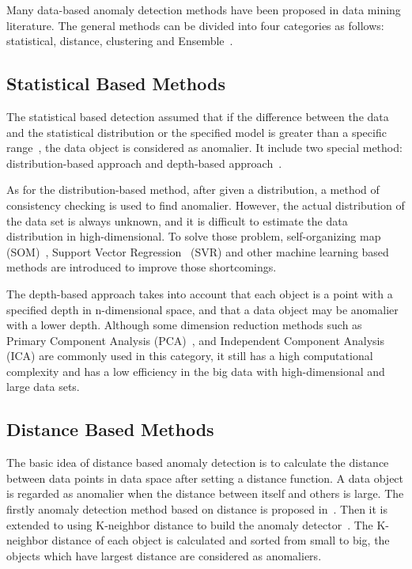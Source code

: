 Many data-based anomaly detection methods have been proposed in
data mining literature.
The general methods can be divided into four categories as follows:
statistical,
distance,
clustering and Ensemble~\cite{cook2019anomaly}.


\subsection{Statistical Based Methods}

The statistical based detection assumed that
if the difference between the data and the statistical
distribution or the specified model
is greater than a specific range~\cite{chandola2009anomaly},
the data object is considered as anomalier.
It include two special method:
distribution-based approach and
depth-based approach~\cite{wu2016survey}.

As for the distribution-based method,
after given a distribution,
a method of consistency checking is used to find anomalier.
However,
the actual distribution of the data set is always unknown,
and it is difficult to estimate the data distribution in high-dimensional.
To solve those problem,
self-organizing map (SOM)~\cite{siripanadorn2010anomaly},
Support Vector Regression~\cite{kromanis2013support} (SVR) and
other machine learning based methods are introduced to
improve those shortcomings.

The depth-based approach takes into account
that each object is a point with
a specified depth in n-dimensional space,
and that a data object may be anomalier with a lower depth.
Although some dimension reduction methods such as
Primary Component Analysis (PCA)~\cite{deng2013modified},
and Independent Component Analysis (ICA)
are commonly used in this category,
it still has a high computational complexity and
has a low efficiency in the big data with
high-dimensional and large data sets.

\subsection{Distance Based Methods}

The basic idea of distance based anomaly detection
is to calculate the distance between data points in
data space after setting a distance function.
A data object is regarded as anomalier when
the distance between  itself and others is large.
The firstly anomaly detection method
based on distance is proposed in~\cite{knorr1997unified}.
Then it is extended to using K-neighbor distance to
build the anomaly detector~\cite{ramaswamy2000efficient,kuang2008anomaly}.
The K-neighbor distance of each object is calculated and
sorted from small to big,
the objects which have largest
distance are considered as anomaliers.


